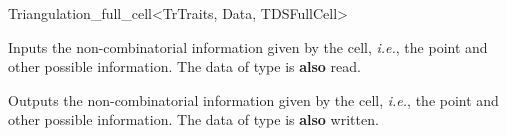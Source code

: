 \begin{ccRefClass}{Triangulation_full_cell<TrTraits, Data, TDSFullCell>}
\ccGlue{}


%
{Inputs the non-combinatorial information given by the cell, \emph{i.e.},
the point and other possible information. The data of type  is
\textbf{also} read.}

%
{Outputs the non-combinatorial information given by the cell, \emph{i.e.},
the point and other possible information. The data of type  is
\textbf{also} written.}

\ccSeeAlso


\end{ccRefClass}
